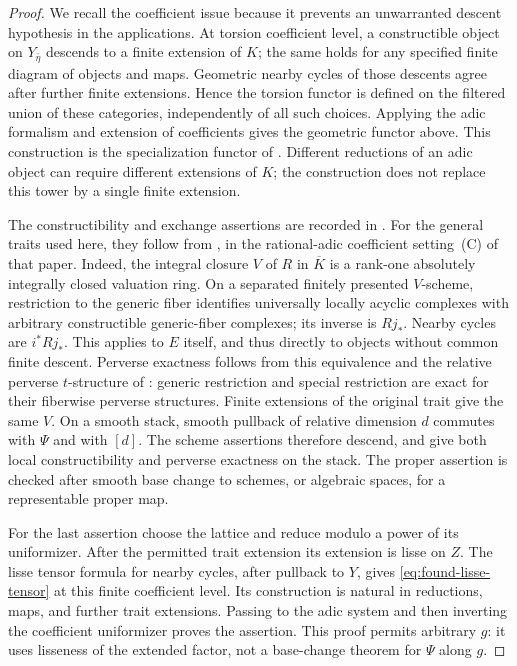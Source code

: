\begin{proof}
We recall the coefficient issue because it prevents an unwarranted descent
hypothesis in the applications.  At torsion coefficient level, a
constructible object on $Y_{\bar\eta}$ descends to a finite extension of
$K$; the same holds for any specified finite diagram of objects and maps.
Geometric nearby cycles of those descents agree after further finite
extensions.  Hence the torsion functor is defined on the filtered union of
these categories, independently of all such choices.  Applying the adic
formalism and extension of coefficients gives the geometric functor above.
This construction is the specialization functor of
\cite[\S\S4.1.1--4.1.5]{GR}.  Different reductions of an adic object can
require different extensions of $K$; the construction does not replace this
tower by a single finite extension.

The constructibility and exchange assertions are recorded in
\cite[\S4.1.6]{GR}.  For the general traits used here, they follow from
\cite[Theorem~4.1 and Corollary~4.2]{HansenScholze}, in the rational-adic
coefficient setting~(C) of that paper.  Indeed, the integral closure $V$ of
$R$ in $\overline K$ is a rank-one absolutely integrally closed valuation
ring.  On a separated finitely presented $V$-scheme, restriction to the
generic fiber identifies universally locally acyclic complexes with
arbitrary constructible generic-fiber complexes; its inverse is $Rj_*$.
Nearby cycles are $i^*Rj_*$.  This applies to $E$ itself, and thus directly
to objects without common finite descent.  Perverse exactness follows
from this equivalence and the relative perverse $t$-structure of
\cite[Theorem~6.7]{HansenScholze}: generic restriction and special
restriction are exact for their fiberwise perverse structures.  Finite
extensions of the original trait give the same $V$.  On a smooth stack,
smooth pullback of relative dimension $d$
commutes with $\Psi$ and with $[d]$.  The scheme assertions therefore
descend, and give both local constructibility and perverse exactness on
the stack.  The proper assertion is checked after smooth base change to
schemes, or algebraic spaces, for a representable proper map.

For the last assertion choose the lattice and reduce modulo a power of its
uniformizer.  After the permitted trait extension its extension is lisse
on $Z$.  The lisse tensor formula for nearby cycles, after pullback to
$Y$, gives \eqref{eq:found-lisse-tensor} at this finite coefficient level.
Its construction is natural in reductions, maps, and further trait
extensions.  Passing to the adic system and then inverting the coefficient
uniformizer proves the assertion.  This proof permits arbitrary $g$:
it uses lisseness of the extended factor, not a base-change theorem for
$\Psi$ along $g$.
\end{proof}

